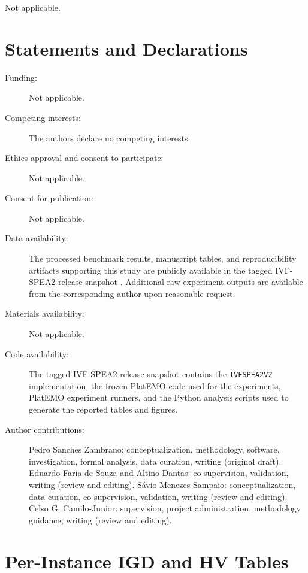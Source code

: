 \documentclass[pdflatex,sn-mathphys-ay]{sn-jnl}%
\theoremstyle{thmstyleone}%
\theoremstyle{thmstyletwo}%
\theoremstyle{thmstylethree}%
\begin{document}
\backmatter


Not applicable.

\section*{Statements and Declarations}

\begin{description}
	\item[Funding:] Not applicable.
	\item[Competing interests:] The authors declare no competing interests.
	\item[Ethics approval and consent to participate:] Not applicable.
	\item[Consent for publication:] Not applicable.
	\item[Data availability:] The processed benchmark results, manuscript tables, and reproducibility artifacts supporting this study are publicly available in the tagged IVF-SPEA2 release snapshot \citep{zambrano2026ivfspea2repo}. Additional raw experiment outputs are available from the corresponding author upon reasonable request.
	\item[Materials availability:] Not applicable.
	\item[Code availability:] The tagged IVF-SPEA2 release snapshot \citep{zambrano2026ivfspea2repo} contains the \texttt{IVFSPEA2V2} implementation, the frozen PlatEMO code used for the experiments, PlatEMO experiment runners, and the Python analysis scripts used to generate the reported tables and figures.
	\item[Author contributions:] Pedro Sanches Zambrano: conceptualization, methodology, software, investigation, formal analysis, data curation, writing (original draft). Eduardo Faria de Souza and Altino Dantas: co-supervision, validation, writing (review and editing). S\'avio Menezes Sampaio: conceptualization, data curation, co-supervision, validation, writing (review and editing). Celso G. Camilo-Junior: supervision, project administration, methodology guidance, writing (review and editing).
\end{description}



\appendix

\section{Per-Instance IGD and HV Tables}\label{app:tables}
\end{document}
